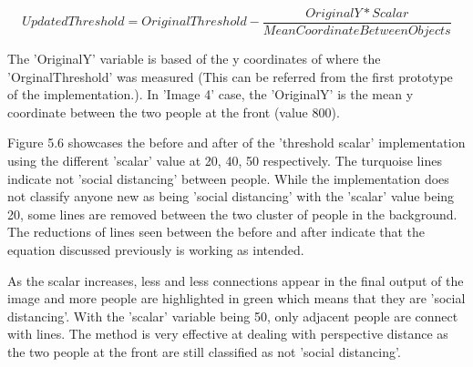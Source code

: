 \documentclass[12pt]{report}
\begin{document}
\begin{equation*}
UpdatedThreshold = OriginalThreshold - \frac{OriginalY*Scalar}{MeanCoordinateBetweenObjects}
\end{equation*}

The 'OriginalY' variable is based of the y coordinates of where the 'OrginalThreshold' was measured (This can be referred from the first prototype of the implementation.). In 'Image 4' case, the 'OriginalY' is the mean y coordinate between the two people at the front (value 800). 

\vspace{2mm}

Figure 5.6 showcases the before and after of the 'threshold scalar' implementation using the different 'scalar' value at 20, 40, 50 respectively. The turquoise lines indicate not 'social distancing' between people. While  the implementation does not classify anyone new as being 'social distancing' with the 'scalar' value being 20, some lines are removed between the two cluster of people in the background. The reductions of lines seen between the before and after indicate that the equation discussed previously is working as intended.

\vspace{2mm}

As the scalar increases, less and less connections appear in the final output of the image and more people are highlighted in green which means that they are 'social distancing'. With the 'scalar' variable being 50, only adjacent people are connect with lines. The method is very effective at dealing with perspective distance as the two people at the front are still classified as not 'social distancing'.
\end{document}
